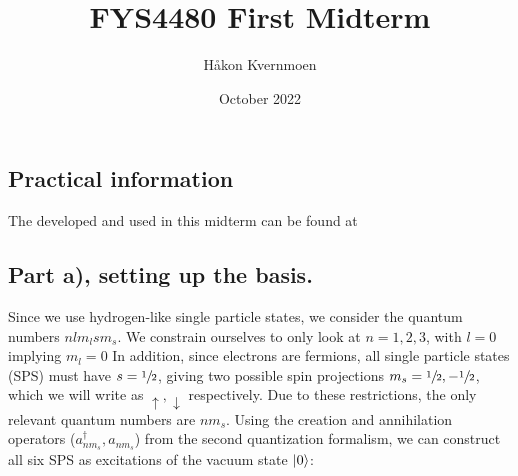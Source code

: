 \documentclass{article}
\title{FYS4480 First Midterm}
\author{Håkon Kvernmoen}
\date{October 2022}
\newcommand{\vac}{\ket{0}}
\newcommand{\crt}[1]{a_{#1}^{\dagger}}
\newcommand{\ani}[1]{a_{#1}}
\begin{document}
\maketitle

\subsection*{Practical information}
    The developed and used in this midterm can be found at  

\subsection*{Part a), setting up the basis.}
    Since we use hydrogen-like single particle states, we consider the quantum numbers $nlm_l sm_s$. We constrain ourselves to only look at $n = 1,2,3$, with $l = 0$ implying $m_l = 0$ In addition, since electrons are fermions, all single particle states (SPS) must have $s = \sfrac{1}{2}$, giving two possible spin projections $m_s = \sfrac{1}{2}, -\sfrac{1}{2}$, which we will write as $\uparrow, \downarrow$ respectively. Due to these restrictions, the only relevant quantum numbers are $nm_s$. Using the creation and annihilation operators ($\crt{nm_s}, \ani{nm_s}$) from the second quantization formalism, we can construct all six SPS as excitations of the vacuum state $\vac$:
    
\end{document}
